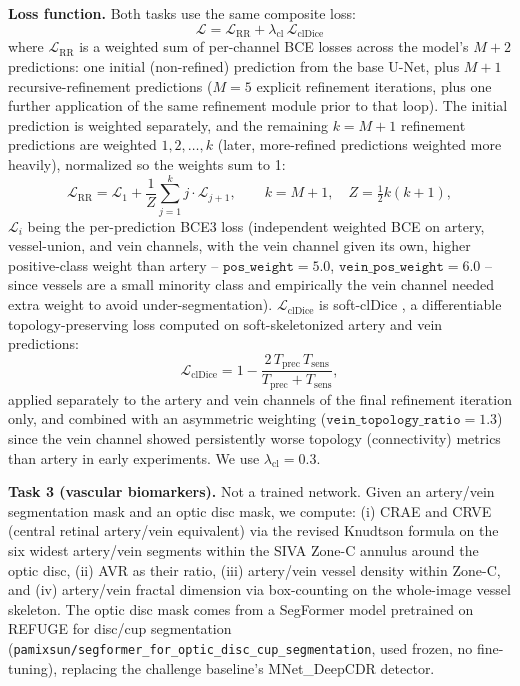\documentclass[runningheads]{llncs}
\begin{document}
\textbf{Loss function.} Both tasks use the same composite loss:
\begin{equation}
\mathcal{L} = \mathcal{L}_{\text{RR}} + \lambda_{\text{cl}}\,\mathcal{L}_{\text{clDice}}
\label{eq:total_loss}
\end{equation}
where $\mathcal{L}_{\text{RR}}$ is a weighted sum of per-channel BCE losses
across the model's $M{+}2$ predictions: one initial (non-refined) prediction
from the base U-Net, plus $M{+}1$ recursive-refinement predictions ($M{=}5$
explicit refinement iterations, plus one further application of the same
refinement module prior to that loop). The initial prediction is weighted
separately, and the remaining $k{=}M{+}1$ refinement predictions are
weighted $1,2,\dots,k$ (later, more-refined predictions weighted more
heavily), normalized so the weights sum to 1:
\begin{equation}
\mathcal{L}_{\text{RR}} = \mathcal{L}_1 + \frac{1}{Z}\sum_{j=1}^{k} j \cdot \mathcal{L}_{j+1},
\qquad k = M{+}1, \quad Z = \tfrac{1}{2}k(k{+}1),
\label{eq:rrloss}
\end{equation}
$\mathcal{L}_i$ being the per-prediction BCE3 loss (independent weighted BCE
on artery, vessel-union, and vein channels, with the vein channel given its
own, higher positive-class weight than artery -- $\texttt{pos\_weight}=5.0$,
$\texttt{vein\_pos\_weight}=6.0$ -- since vessels are a small minority class
and empirically the vein channel needed extra weight to avoid
under-segmentation). $\mathcal{L}_{\text{clDice}}$ is soft-clDice
\cite{shit2021cldice}, a differentiable topology-preserving loss computed on
soft-skeletonized artery and vein predictions:
\begin{equation}
\mathcal{L}_{\text{clDice}} = 1 - \frac{2\,T_{\text{prec}}\,T_{\text{sens}}}{T_{\text{prec}} + T_{\text{sens}}},
\end{equation}
applied separately to the artery and vein channels of the final refinement
iteration only, and combined with an asymmetric weighting
($\texttt{vein\_topology\_ratio}=1.3$) since the vein channel showed
persistently worse topology (connectivity) metrics than artery in early
experiments. We use $\lambda_{\text{cl}} = 0.3$.

\textbf{Task 3 (vascular biomarkers).} Not a trained network. Given an
artery/vein segmentation mask and an optic disc mask, we compute: (i) CRAE
and CRVE (central retinal artery/vein equivalent) via the revised Knudtson
formula \cite{knudtson2003revised} on the six widest artery/vein segments
within the SIVA Zone-C annulus around the optic disc, (ii) AVR as their
ratio, (iii) artery/vein vessel density within Zone-C, and (iv) artery/vein
fractal dimension via box-counting on the whole-image vessel skeleton. The
optic disc mask comes from a SegFormer model \cite{xie2021segformer}
pretrained on REFUGE for disc/cup segmentation
(\texttt{pamixsun/\allowbreak segformer\_\allowbreak for\_\allowbreak optic\_\allowbreak disc\_\allowbreak cup\_\allowbreak segmentation}, used
frozen, no fine-tuning), replacing the challenge baseline's MNet\_DeepCDR
detector.
\end{document}
